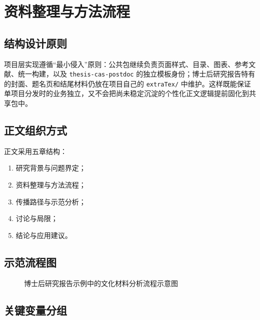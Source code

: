 \chapter{资料整理与方法流程}

\section{结构设计原则}

项目层实现遵循“最小侵入”原则：公共包继续负责页面样式、目录、图表、参考文献、统一构建，以及 \texttt{thesis-cas-postdoc} 的独立模板身份；博士后研究报告特有的封面、题名页和结尾材料仍放在项目自己的 \texttt{extraTex/} 中维护。这样既能保证单项目分发时的业务独立，又不会把尚未稳定沉淀的个性化正文逻辑提前固化到共享包中。

\section{正文组织方式}

正文采用五章结构：

\begin{enumerate}
  \item 研究背景与问题界定；
  \item 资料整理与方法流程；
  \item 传播路径与示范分析；
  \item 讨论与局限；
  \item 结论与应用建议。
\end{enumerate}

\section{示范流程图}

\begin{figure}[H]
  \centering
  \caption{博士后研究报告示例中的文化材料分析流程示意图}
  \label{fig:postdoc-workflow}
\end{figure}

\section{关键变量分组}

